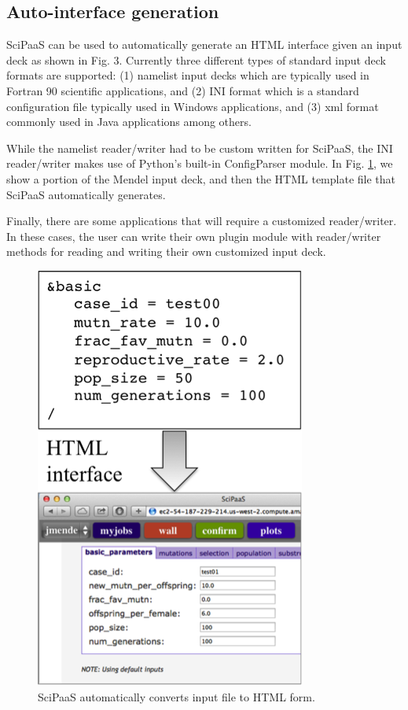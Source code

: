 \documentclass[10pt,reprint]{socc14}
\begin{document}
\subsection{Auto-interface generation}

SciPaaS can be used to automatically generate an HTML interface given an input deck as shown in Fig. 3.  Currently three different types of standard input deck formats are supported: (1) namelist input decks which are typically used in Fortran 90 scientific applications, and (2) INI format which is a standard configuration file typically used in Windows applications, and (3) xml format commonly used in Java applications among others.

While the namelist reader/writer had to be custom written for SciPaaS, the INI reader/writer makes use of Python’s built-in ConfigParser module.  In Fig. \ref{interface}, we show a portion of the Mendel input deck, and then the HTML template file that SciPaaS automatically generates.

Finally, there are some applications that will require a customized reader/writer.  In these cases, the user can write their own plugin module with reader/writer methods for reading and writing their own customized input deck.

\begin{figure}[t]
\centering
\includegraphics[natwidth=336,natheight=527]{figs/interface.png}
\caption{SciPaaS automatically converts input file to HTML form. \label{interface}}
\end{figure}
\end{document}
